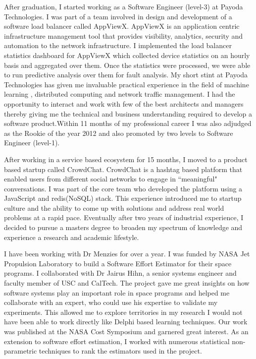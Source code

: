\documentclass{article}
\begin{document}
\bigskip

After graduation, I started working as a Software Engineer (level-3) at Payoda Technologies. I was part of a team involved in design and development of a software load balancer called AppViewX. AppViewX is an application centric infrastructure management tool that provides visibility, analytics, security and automation to the network infrastructure. I implemented the load balancer statistics dashboard for AppViewX which collected device statistics on an hourly basis and aggregated over them. Once the statistics were processed, we were able to run predictive analysis over them for fault analysis. My short stint at Payoda Technologies has given me invaluable practical experience in the field of machine learning , 
distributed computing and network traffic management. I had the opportunity to interact and 
work with few of the best architects and managers thereby giving me the technical and business
understanding required to develop a software product.Within 11 months of my professional career I was also adjudged as the Rookie of the year 2012 and also promoted by two levels to Software Engineer (level-1). 

\bigskip
After working in a service based ecosystem for 15 months, I moved to a product based startup called CrowdChat. CrowdChat is a hashtag based platform that enabled users from different social networks to engage in ``meaningful" conversations. I was part of the  core team who developed the platform using a JavaScript and redis(NoSQL) stack. This experience introduced me to startup culture and the ability to come up with solutions and address real world problems at a rapid pace. Eventually after two years of industrial experience, I decided to pursue a masters degree to broaden my spectrum of knowledge and experience a research and academic lifestyle.


\bigskip
I have been working with Dr Menzies for over a year. I was funded by NASA Jet Propulsion Laboratory to build a Software Effort Estimator for their space programs. I collaborated with Dr Jairus Hihn, a senior systems engineer and faculty member of USC and CalTech. The project gave me great insights on how software systems play an important role in space programs and helped me collaborate with an expert, who could use his expertise to validate my experiments. This allowed me to explore territories in my research I would not have been able to work directly like Delphi based learning techniques. Our work was published at the NASA Cost Symposium and garnered great interest. As an extension to software effort estimation, I worked with numerous statistical non-parametric techniques to rank the estimators used in the project.
\end{document}
